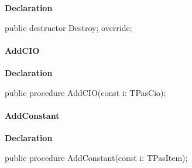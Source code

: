 \documentclass{report}
\newif\ifpdf
\begin{document}
\label{PasDoc_Items.TPasUnit-Destroy}
\begin{list}{}{
\setlength{\itemindent}{0cm}
\setlength{\listparindent}{0cm}
\setlength{\leftmargin}{\evensidemargin}
\addtolength{\leftmargin}{\tmplength}
\settowidth{\labelsep}{X}
\addtolength{\leftmargin}{\labelsep}
\setlength{\labelwidth}{\tmplength}
}
\item[\textbf{Declaration}\hfill]
\ifpdf
\begin{flushleft}
\fi
\begin{ttfamily}
public destructor Destroy; override;\end{ttfamily}

\ifpdf
\end{flushleft}
\fi

\end{list}
\paragraph*{AddCIO}\hspace*{\fill}

\label{PasDoc_Items.TPasUnit-AddCIO}
\begin{list}{}{
\setlength{\itemindent}{0cm}
\setlength{\listparindent}{0cm}
\setlength{\leftmargin}{\evensidemargin}
\addtolength{\leftmargin}{\tmplength}
\settowidth{\labelsep}{X}
\addtolength{\leftmargin}{\labelsep}
\setlength{\labelwidth}{\tmplength}
}
\item[\textbf{Declaration}\hfill]
\ifpdf
\begin{flushleft}
\fi
\begin{ttfamily}
public procedure AddCIO(const i: TPasCio);\end{ttfamily}

\ifpdf
\end{flushleft}
\fi

\end{list}
\paragraph*{AddConstant}\hspace*{\fill}

\label{PasDoc_Items.TPasUnit-AddConstant}
\begin{list}{}{
\setlength{\itemindent}{0cm}
\setlength{\listparindent}{0cm}
\setlength{\leftmargin}{\evensidemargin}
\addtolength{\leftmargin}{\tmplength}
\settowidth{\labelsep}{X}
\addtolength{\leftmargin}{\labelsep}
\setlength{\labelwidth}{\tmplength}
}
\item[\textbf{Declaration}\hfill]
\ifpdf
\begin{flushleft}
\fi
\begin{ttfamily}
public procedure AddConstant(const i: TPasItem);\end{ttfamily}

\ifpdf
\end{flushleft}
\fi

\end{list}
\end{document}
